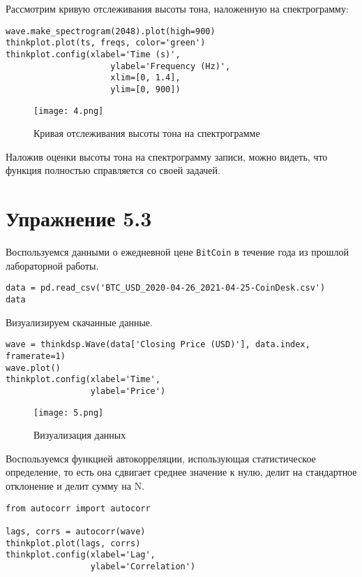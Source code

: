 \documentclass[a4paper,12pt]{report}
\begin{document}
Рассмотрим кривую отслеживания высоты тона, наложенную на спектрограмму:

\begin{lstlisting}[caption=Кривая отслеживания высоты тона на спектрограмме]
wave.make_spectrogram(2048).plot(high=900)
thinkplot.plot(ts, freqs, color='green')
thinkplot.config(xlabel='Time (s)', 
                     ylabel='Frequency (Hz)',
                     xlim=[0, 1.4],
                     ylim=[0, 900])
\end{lstlisting}

\begin{figure}[H]
        \centering
        \texttt{[image: 4.png]}
        \caption{Кривая отслеживания высоты тона на спектрограмме}
        \label{fig:lab5_fig2_2}
\end{figure}

Наложив оценки высоты тона на спектрограмму записи, можно видеть, что функция полностью справляется со своей задачей.

\chapter{Упражнение 5.3}

Воспользуемся данными о ежедневной цене \texttt{BitCoin} в течение года из прошлой лабораторной работы.

\begin{lstlisting}[caption=Таблица данных]
data = pd.read_csv('BTC_USD_2020-04-26_2021-04-25-CoinDesk.csv')
data
\end{lstlisting}

Визуализируем скачанные данные.

\begin{lstlisting}[caption=Визуализация данных]
wave = thinkdsp.Wave(data['Closing Price (USD)'], data.index, framerate=1)
wave.plot()
thinkplot.config(xlabel='Time',
                 ylabel='Price')
\end{lstlisting}

\begin{figure}[H]
        \centering
        \texttt{[image: 5.png]}
        \caption{Визуализация данных}
        \label{fig:lab5_fig3_2}
\end{figure}

Воспользуемся функцией автокорреляции, использующая статистическое определение, то есть она сдвигает среднее значение к нулю, делит на стандартное отклонение и делит сумму на N.

\begin{lstlisting}[caption=Автокорреляция при помощи \texttt{autocorr}]
from autocorr import autocorr

lags, corrs = autocorr(wave)
thinkplot.plot(lags, corrs)
thinkplot.config(xlabel='Lag',
                 ylabel='Correlation')
\end{lstlisting}
\end{document}
